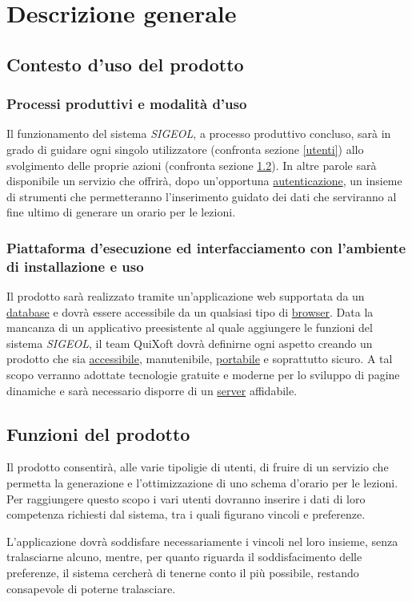\documentclass[11pt,a4paper]{article}
\begin{document}
\section{Descrizione generale}
\subsection{Contesto d'uso del prodotto}
\subsubsection{Processi produttivi e modalità d'uso}
Il funzionamento del sistema \textit{SIGEOL}, a processo produttivo concluso, sarà in grado di guidare ogni singolo utilizzatore (confronta sezione \ref{utenti}) allo svolgimento delle proprie azioni (confronta sezione \ref{funzioni}). In altre parole sarà disponibile un servizio che offrirà, dopo un'opportuna \underline{autenticazione}, un insieme di strumenti che permetteranno l'inserimento guidato dei dati che serviranno al fine ultimo di generare un orario per le lezioni.
\subsubsection{Piattaforma d’esecuzione ed interfacciamento con l’ambiente di installazione e uso}
Il prodotto sarà realizzato tramite un'applicazione web supportata da un \underline{database} e dovrà essere accessibile da un qualsiasi tipo di \underline{browser}. Data la mancanza di un applicativo preesistente al quale aggiungere le funzioni del sistema \textit{SIGEOL}, il team QuiXoft dovrà definirne ogni aspetto creando un prodotto che sia \underline{accessibile}, manutenibile, \underline{portabile} e soprattutto sicuro. A tal scopo verranno adottate tecnologie gratuite e moderne per lo sviluppo di pagine dinamiche e sarà necessario disporre di un \underline{server} affidabile.
\subsection{Funzioni del prodotto} \label{funzioni}
Il prodotto consentirà, alle varie tipoligie di utenti, di fruire di un servizio che permetta la generazione e l'ottimizzazione di uno schema d'orario per le lezioni. Per raggiungere questo scopo i vari utenti dovranno inserire i dati di loro competenza richiesti dal sistema, tra i quali figurano vincoli e preferenze.

L'applicazione dovrà soddisfare necessariamente i vincoli nel loro insieme, senza tralasciarne alcuno, mentre, per quanto riguarda il soddisfacimento delle preferenze, il sistema cercherà di tenerne conto il più possibile, restando consapevole di poterne tralasciare.
\end{document}
